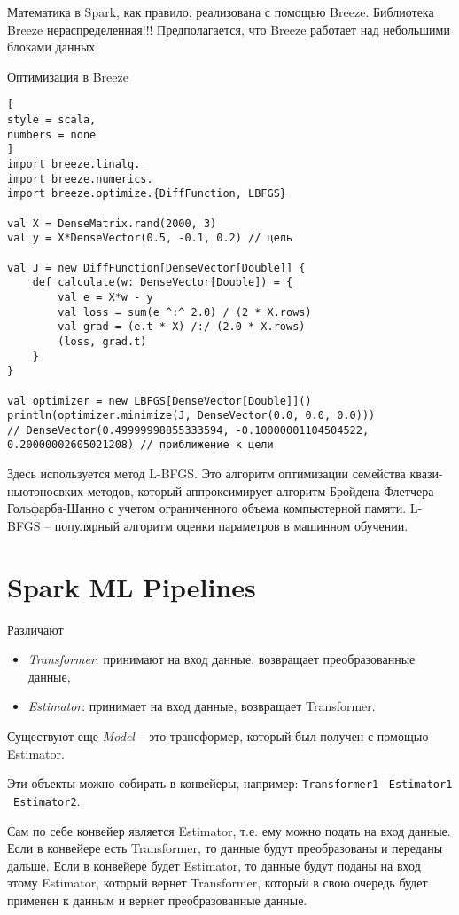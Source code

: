 \documentclass[%
	11pt,
	a4paper,
	utf8,
		]{article}
\begin{document}
Математика в Spark, как правило, реализована с помощью Breeze. Библиотека Breeze нераспределенная!!! Предполагается, что Breeze работает над небольшими блоками данных.

Оптимизация в Breeze
\begin{lstlisting}[
style = scala,
numbers = none
]
import breeze.linalg._
import breeze.numerics._
import breeze.optimize.{DiffFunction, LBFGS}

val X = DenseMatrix.rand(2000, 3)
val y = X*DenseVector(0.5, -0.1, 0.2) // цель

val J = new DiffFunction[DenseVector[Double]] {
    def calculate(w: DenseVector[Double]) = {
        val e = X*w - y
        val loss = sum(e ^:^ 2.0) / (2 * X.rows)
        val grad = (e.t * X) /:/ (2.0 * X.rows)
        (loss, grad.t)
    }
}

val optimizer = new LBFGS[DenseVector[Double]]()
println(optimizer.minimize(J, DenseVector(0.0, 0.0, 0.0)))
// DenseVector(0.49999998855333594, -0.10000001104504522, 0.20000002605021208) // приближение к цели
\end{lstlisting}

Здесь используется метод L-BFGS. Это алгоритм оптимизации семейства квази-ньютоносвких методов, который аппроксимирует алгоритм Бройдена-Флетчера-Гольфарба-Шанно с учетом ограниченного объема компьютерной памяти. L-BFGS -- популярный алгоритм оценки параметров в машинном обучении.

\section{Spark ML Pipelines}

Различают
\begin{itemize}
	\item \emph{Transformer}: принимают на вход данные, возвращает преобразованные данные,
	
	\item \emph{Estimator}: принимает на вход данные, возвращает Transformer.
\end{itemize}

Существуют еще \emph{Model} -- это трансформер, который был получен с помощью Estimator.

Эти объекты можно собирать в конвейеры, например: \texttt{Transformer1} \textrightarrow\ \texttt{Estimator1} \textrightarrow\ \texttt{Estimator2}.

Сам по себе конвейер является Estimator, т.е. ему можно подать на вход данные. Если в конвейере есть Transformer, то данные будут преобразованы и переданы дальше. Если в конвейере будет Estimator, то данные будут поданы на вход этому Estimator, который вернет Transformer, который в свою очередь будет применен к данным и вернет преобразованные данные.
\end{document}
